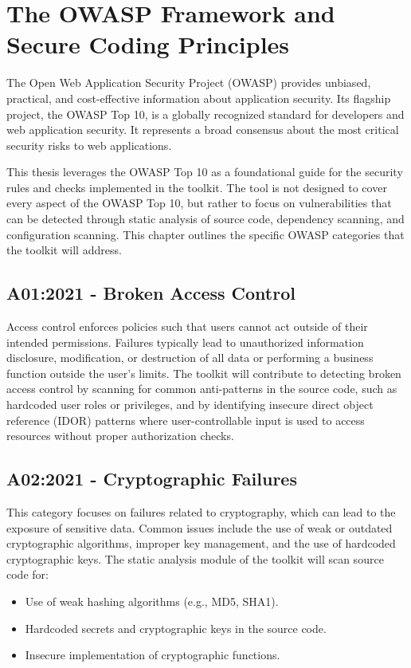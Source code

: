 \chapter{The OWASP Framework and Secure Coding Principles}
\label{chap:owasp}
\setlength{\parskip}{1em}

The Open Web Application Security Project (OWASP) provides unbiased, practical, and cost-effective information about application security. Its flagship project, the OWASP Top 10, is a globally recognized standard for developers and web application security. It represents a broad consensus about the most critical security risks to web applications.

This thesis leverages the OWASP Top 10 as a foundational guide for the security rules and checks implemented in the toolkit. The tool is not designed to cover every aspect of the OWASP Top 10, but rather to focus on vulnerabilities that can be detected through static analysis of source code, dependency scanning, and configuration scanning. This chapter outlines the specific OWASP categories that the toolkit will address.

\section{A01:2021 - Broken Access Control}
Access control enforces policies such that users cannot act outside of their intended permissions. Failures typically lead to unauthorized information disclosure, modification, or destruction of all data or performing a business function outside the user's limits. 
The toolkit will contribute to detecting broken access control by scanning for common anti-patterns in the source code, such as hardcoded user roles or privileges, and by identifying insecure direct object reference (IDOR) patterns where user-controllable input is used to access resources without proper authorization checks.

\section{A02:2021 - Cryptographic Failures}
This category focuses on failures related to cryptography, which can lead to the exposure of sensitive data. Common issues include the use of weak or outdated cryptographic algorithms, improper key management, and the use of hardcoded cryptographic keys.
The static analysis module of the toolkit will scan source code for:
\begin{itemize}
    \item Use of weak hashing algorithms (e.g., MD5, SHA1).
    \item Hardcoded secrets and cryptographic keys in the source code.
    \item Insecure implementation of cryptographic functions.
\end{itemize}

